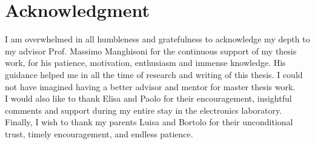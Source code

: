 \chapter*{Acknowledgment} 

I am overwhelmed in all humbleness and gratefulness to acknowledge my depth to my advisor Prof. Massimo Manghisoni for the continuous support of my thesis work, for his patience, motivation, enthusiasm and immense knowledge. His guidance helped me in all the time of research and writing of this thesis. I could not have imagined having a better advisor and mentor for master thesis work.\\
I would also like to thank Elisa and Paolo for their encouragement, insightful comments and support during my entire stay in the electronics laboratory. \\
Finally, I wish to thank my parents Luisa and Bortolo for their unconditional trust, timely encouragement, and endless patience.